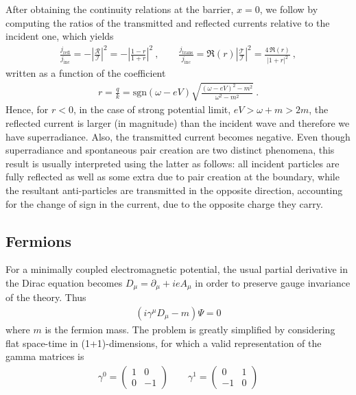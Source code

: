 After obtaining the continuity relations at the barrier, $x=0$, we follow by computing the ratios of the transmitted and reflected currents relative to the incident one, which yields
\begin{align}
    \frac{j_\mathrm{refl}}{j_\mathrm{inc}} = - \left|\frac{\mathcal{R}}{\mathcal{I}}\right|^2 = -\left|\frac{1-r}{1+r}\right|^2  ~, \qquad \frac{j_\mathrm{trans}}{j_\mathrm{inc}} = \Re(r) \left|\frac{\mathcal{T}}{\mathcal{I}}\right|^2 = \frac{4\, \Re(r)}{|1+r|^2} ~,
\end{align}
written as a function of the coefficient 
\begin{align}
    r = \frac{q}{k} = \mathrm{sgn}(\omega - e V)  \sqrt{\frac{(\omega - e V)^2 - m^2}{\omega^2 - m^2}} ~.
\end{align}
Hence, for $r<0$, in the case of strong potential limit, $e V > \omega + m > 2 m$, the reflected current is larger (in magnitude) than the incident wave and therefore we have superradiance. Also, the transmitted current becomes negative. Even though superradiance and spontaneous pair creation are two distinct phenomena, this result is usually interpreted using the latter as follows: all incident particles are fully reflected as well as some extra due to pair creation at the boundary, while the resultant anti-particles are transmitted in the opposite direction, accounting for the change of sign in the current, due to the opposite charge they carry.




\subsection{Fermions}

For a minimally coupled electromagnetic potential, the usual partial derivative in the Dirac equation becomes $D_\mu = \partial_\mu + i e A_\mu$ in order to preserve gauge invariance of the theory. Thus
\begin{align}
    ( i \gamma^\mu D_\mu - m ) \Psi = 0
    \label{eq:dirac}
\end{align}
where $m$ is the fermion mass.
The problem is greatly simplified by considering flat space-time in (1+1)-dimensions, for which a valid representation of the gamma matrices is
\begin{align}
    \gamma^0 = \left(\begin{array}{cr} 1 & 0 \\  0 & -1 \end{array}\right) \qquad 
    \gamma^1 = \left(\begin{array}{cr} 0 & 1 \\ -1 & 0 \end{array}\right)
    \label{eq:gamma1+1}
\end{align}


